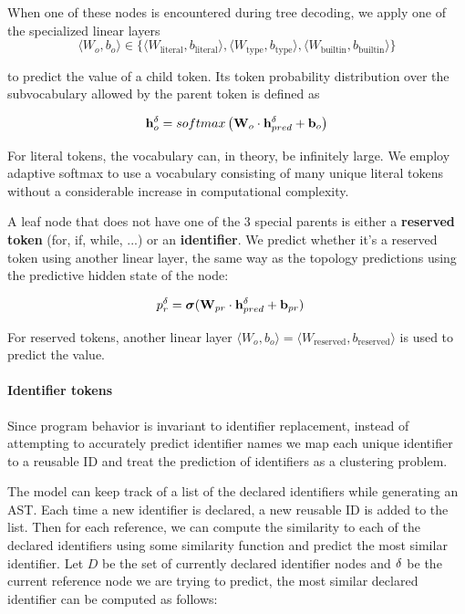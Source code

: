 When one of these nodes is encountered during tree decoding, we apply one of the specialized linear layers
\begin{equation}
\langle W_o,b_o \rangle \in \{\langle W_\text{literal},b_\text{literal} \rangle, \langle W_\text{type},b_\text{type} \rangle, \langle W_\text{builtin},b_\text{builtin} \rangle \}
\end{equation}

to predict the value of a child token. Its token probability distribution over the subvocabulary allowed by the parent token is defined as

\begin{align}
    \mathbf{h}_o^\delta =  softmax\left(\mathbf{W}_o \cdot \mathbf{h}_{pred}^\delta + \mathbf{b}_{o}\right) \label{eq:label_pred}
\end{align}

For literal tokens, the vocabulary can, in theory, be infinitely large. We employ adaptive softmax \cite{grave2017efficient} to use a vocabulary consisting of many unique literal tokens without a considerable increase in computational complexity.

A leaf node that does not have one of the 3 special parents is either a \textbf{reserved token} (for, if, while, ...) or an \textbf{identifier}. We predict whether it's a reserved token using another linear layer, the same way as the topology predictions using the predictive hidden state of the node: 

\begin{align}
    p_r^\delta &= \boldsymbol\sigma(\mathbf{W}_{pr} \cdot \mathbf{h}_{pred}^\delta + \mathbf{b}_{pr}) \label{eq:res_pred}
\end{align}

For reserved tokens, another linear layer $\langle W_o,b_o \rangle = \langle W_\text{reserved},b_\text{reserved} \rangle$ is used to predict the value.

\paragraph{Identifier tokens}
Since program behavior is invariant to identifier replacement, instead of attempting to accurately predict identifier names we map each unique identifier to a reusable ID \cite{tufano2019learning} and treat the prediction of identifiers as a clustering problem. 

The model can keep track of a list of the declared identifiers while generating an AST. Each time a new identifier is declared, a new reusable ID is added to the list. Then for each reference, we can compute the similarity to each of the declared identifiers using some similarity function and predict the most similar identifier. Let $D$ be the set of currently declared identifier nodes and $\delta$ be the current reference node we are trying to predict, the most similar declared identifier can be computed as follows:

